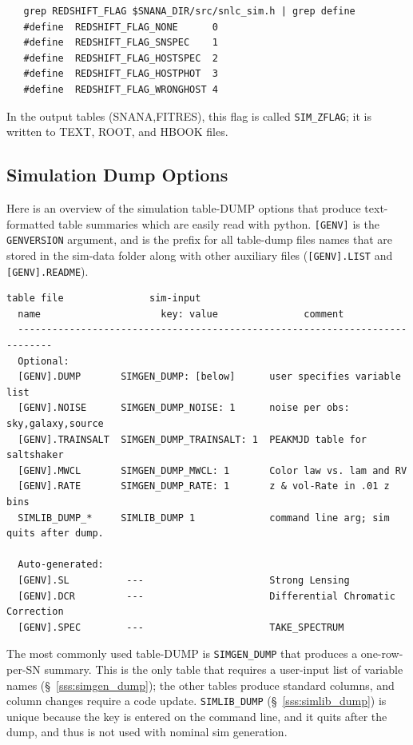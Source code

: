 \documentclass[12pt]{article}
\begin{document}
\begin{verbatim}
   grep REDSHIFT_FLAG $SNANA_DIR/src/snlc_sim.h | grep define
   #define  REDSHIFT_FLAG_NONE      0
   #define  REDSHIFT_FLAG_SNSPEC    1 
   #define  REDSHIFT_FLAG_HOSTSPEC  2
   #define  REDSHIFT_FLAG_HOSTPHOT  3
   #define  REDSHIFT_FLAG_WRONGHOST 4
\end{verbatim}

In the output tables (SNANA,FITRES), this flag is called {\tt SIM\_ZFLAG};
it is written to TEXT, ROOT, and HBOOK files.


  \clearpage
   \subsection{Simulation Dump Options}
   \label{subsec:dump_options}

Here is an overview of the simulation table-DUMP options that
produce text-formatted table summaries which are easily read with
python. {\tt [GENV]} is the {\tt GENVERSION} argument,
and is the prefix for all table-dump files names that are
stored in the sim-data folder along with other auxiliary files
({\tt [GENV].LIST} and {\tt [GENV].README}).
%
\begin{Verbatim}[frame=single]
  table file               sim-input
  name                     key: value               comment
  ----------------------------------------------------------------------------
  Optional:
  [GENV].DUMP       SIMGEN_DUMP: [below]      user specifies variable list
  [GENV].NOISE      SIMGEN_DUMP_NOISE: 1      noise per obs: sky,galaxy,source
  [GENV].TRAINSALT  SIMGEN_DUMP_TRAINSALT: 1  PEAKMJD table for saltshaker
  [GENV].MWCL       SIMGEN_DUMP_MWCL: 1       Color law vs. lam and RV
  [GENV].RATE       SIMGEN_DUMP_RATE: 1       z & vol-Rate in .01 z bins
  SIMLIB_DUMP_*     SIMLIB_DUMP 1             command line arg; sim quits after dump.

  Auto-generated:
  [GENV].SL          ---                      Strong Lensing
  [GENV].DCR         ---                      Differential Chromatic Correction
  [GENV].SPEC        ---                      TAKE_SPECTRUM 
\end{Verbatim}
%
The most commonly used table-DUMP is {\tt SIMGEN\_DUMP} that produces
a one-row-per-SN summary. This is the only table that requires
a user-input list of variable names (\S~\ref{sss:simgen_dump});
the other tables produce standard columns, and column changes
require a code update. 
{\tt SIMLIB\_DUMP} (\S~\ref{sss:simlib_dump}) is unique because
the key is entered on the command line, and it quits after the dump,
and thus is not used with nominal sim generation.
\end{document}
